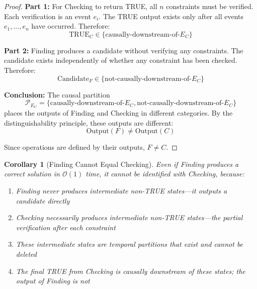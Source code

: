 \documentclass[twocolumn,10pt]{article}
\newtheorem{corollary}[theorem]{Corollary}
\theoremstyle{definition}
\theoremstyle{remark}
\newcommand{\bigO}{\mathcal{O}}
\begin{document}
\begin{proof}
\textbf{Part 1:} For Checking to return TRUE, all $n$ constraints must be verified. Each verification is an event $e_i$. The TRUE output exists only after all events $e_1, \ldots, e_n$ have occurred. Therefore:
\begin{equation}
\text{TRUE}_C \in \{\text{causally-downstream-of-}E_C\}
\end{equation}

\textbf{Part 2:} Finding produces a candidate without verifying any constraints. The candidate exists independently of whether any constraint has been checked. Therefore:
\begin{equation}
\text{Candidate}_F \in \{\text{not-causally-downstream-of-}E_C\}
\end{equation}

\textbf{Conclusion:} The causal partition
\begin{equation}
\mathcal{P}_{E_C} = \{\text{causally-downstream-of-}E_C, \text{not-causally-downstream-of-}E_C\}
\end{equation}
places the outputs of Finding and Checking in different categories. By the distinguishability principle, these outputs are different:
\begin{equation}
\text{Output}(F) \neq \text{Output}(C)
\end{equation}

Since operations are defined by their outputs, $F \neq C$.
\end{proof}

\begin{corollary}[Finding Cannot Equal Checking]
\label{cor:f_neq_c_causal}
Even if Finding produces a correct solution in $\bigO(1)$ time, it cannot be identified with Checking, because:
\begin{enumerate}
\item Finding never produces intermediate non-TRUE states—it outputs a candidate directly
\item Checking necessarily produces intermediate non-TRUE states—the partial verification after each constraint
\item These intermediate states are temporal partitions that exist and cannot be deleted
\item The final TRUE from Checking is causally downstream of these states; the output of Finding is not
\end{enumerate}
\end{corollary}
\end{document}
